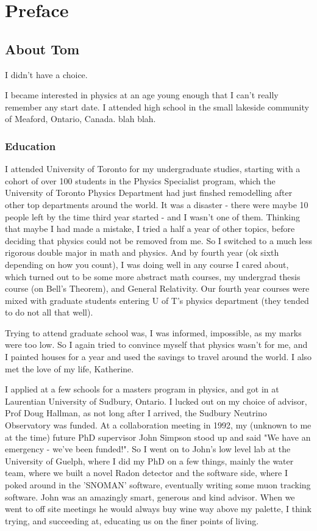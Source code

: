 \documentclass[../rzero]{subfiles}
\begin{document}
\chapter*{Preface}

\section*{About Tom}
I didn't have a choice.

I became interested in physics at an age young enough that I can't really remember any start date. I attended high school in the small lakeside community of Meaford, Ontario, Canada. blah blah.  

\subsection*{Education}
I attended University of Toronto for my undergraduate studies, starting with a cohort of over 100 students in the Physics Specialist program, which the University of Toronto Physics Department had just finshed remodelling after other top departments around the world. It was a disaster - there were maybe 10 people left by the time third year started - and I wasn't one of them. Thinking that maybe I had made a mistake, I tried a half a year of other topics, before deciding that physics could not be removed from me. So I switched to a much less rigorous double major in math and physics. And by fourth year (ok sixth depending on how you count), I was doing well in any course I cared about, which turned out to be some more abstract math courses, my undergrad thesis course (on Bell's Theorem), and General Relativity. Our fourth year courses were mixed with graduate students entering U of T's physics department (they tended to do not all that well). 

Trying to attend graduate school was, I was informed, impossible, as my marks were too low. So I again tried to convince myself that physics wasn't for me, and I painted houses for a year and used the savings to travel around the world. I also met the love of my life, Katherine. 

I applied at a few schools for a masters program in physics, and got in at Laurentian University of Sudbury, Ontario. I lucked out on my choice of advisor, Prof Doug Hallman, as not long after I arrived, the Sudbury Neutrino Observatory was funded. At a collaboration meeting in 1992, my (unknown to me at the time) future PhD supervisor John Simpson stood up and said "We have an emergency - we've been funded!". So I went on to John's low level lab at the University of Guelph, where I did my PhD on a few things, mainly the water team, where we built a novel Radon detector and the software side, where I poked around in the 'SNOMAN' software, eventually writing some muon tracking software. John was an amazingly smart, generous and kind advisor. When we went to off site meetings he would always buy wine way above my palette, I think trying, and succeeding at, educating us on the finer points of living. 
\end{document}
